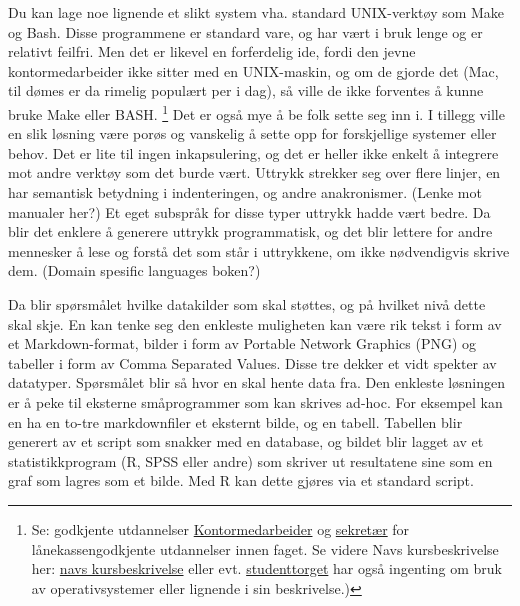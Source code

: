 \documentclass[11pt]{article}
\begin{document}
Du kan lage noe lignende et slikt system vha. standard UNIX-verktøy som Make og Bash. Disse programmene er standard vare, og har vært i bruk lenge og er relativt feilfri. Men det er likevel en forferdelig ide, fordi den jevne kontormedarbeider ikke sitter med en UNIX-maskin, og om de gjorde det (Mac, til dømes er da rimelig populært per i dag), så ville de ikke forventes å kunne bruke Make eller BASH. \footnote{Se: godkjente utdannelser
\href{(https://www.ecademy.no/nettstudier/okonomi-og-administrasjon/kontormedarbeider}{Kontormedarbeider} og \href{(http://www.treider.no/kontor-og-administrasjon/sekretaer/}{sekretær} for lånekassengodkjente utdannelser innen faget. Se videre Navs kursbeskrivelse her: \href{(https://www.nav.no/Forsiden/)attachment/353293?(UNDERLINE ts=13fc24b8e78}{navs kursbeskrivelse} eller evt. \href{(http://www.studenttorget.no/index.php?show=5192&expand=4631,5192&yrkesid=110}{studenttorget} har også ingenting om bruk av operativsystemer eller lignende i sin beskrivelse.) }  Det er også mye å be folk sette seg inn i.
I tillegg ville en slik løsning være porøs og vanskelig å sette opp for forskjellige systemer eller behov. Det er lite til ingen inkapsulering, og det er heller ikke enkelt å integrere mot andre verktøy som det burde vært. Uttrykk strekker seg over flere linjer, en har semantisk betydning i indenteringen, og andre anakronismer. (Lenke mot manualer her?)
Et eget subspråk for disse typer uttrykk hadde vært bedre. Da blir det enklere å generere uttrykk programmatisk, og det blir lettere for andre mennesker å lese og forstå det som står i uttrykkene, om ikke nødvendigvis skrive dem. (Domain spesific languages boken?)



Da blir spørsmålet hvilke datakilder som skal støttes, og på hvilket nivå dette skal skje. En kan tenke seg den enkleste muligheten kan være rik tekst i form av et Markdown-format, bilder i form av Portable Network Graphics (PNG) og tabeller i form av Comma Separated Values. Disse tre dekker et vidt spekter av datatyper. Spørsmålet blir så hvor en skal hente data fra. Den enkleste løsningen er å peke til eksterne småprogrammer som kan skrives ad-hoc. For eksempel kan en ha en to-tre markdownfiler et eksternt bilde, og en tabell. Tabellen blir generert av et script som snakker med en database, og bildet blir lagget av et statistikkprogram (R, SPSS eller andre) som skriver ut resultatene sine som en graf som lagres som et bilde. Med R kan dette gjøres via et standard script.
\end{document}
